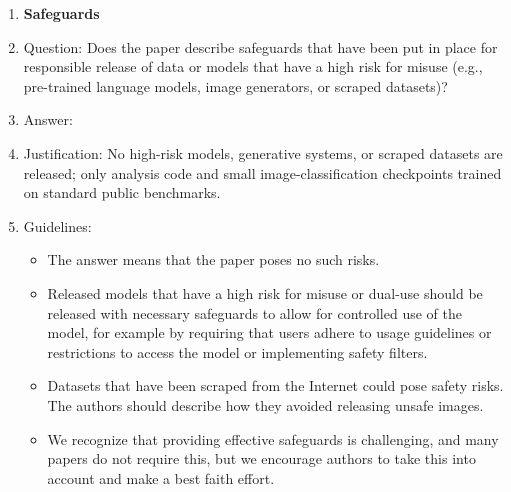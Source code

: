 \documentclass{article}
\begin{document}
\begin{enumerate}
\item {\bf Safeguards}
    \item[] Question: Does the paper describe safeguards that have been put in place for responsible release of data or models that have a high risk for misuse (e.g., pre-trained language models, image generators, or scraped datasets)?
    \item[] Answer: \answerNA{}
    \item[] Justification: No high-risk models, generative systems, or scraped datasets are released; only analysis code and small image-classification checkpoints trained on standard public benchmarks.
    \item[] Guidelines:
    \begin{itemize}
        \item The answer \answerNA{} means that the paper poses no such risks.
        \item Released models that have a high risk for misuse or dual-use should be released with necessary safeguards to allow for controlled use of the model, for example by requiring that users adhere to usage guidelines or restrictions to access the model or implementing safety filters.
        \item Datasets that have been scraped from the Internet could pose safety risks. The authors should describe how they avoided releasing unsafe images.
        \item We recognize that providing effective safeguards is challenging, and many papers do not require this, but we encourage authors to take this into account and make a best faith effort.
    \end{itemize}


\end{enumerate}
\end{document}
